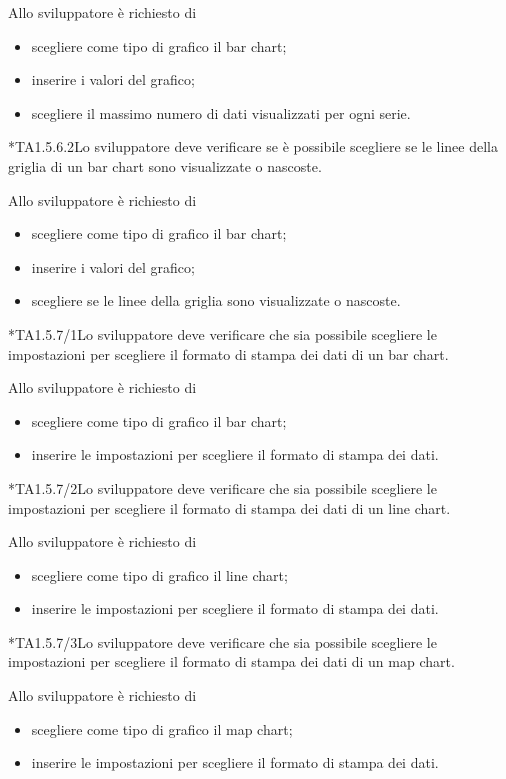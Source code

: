 		Allo sviluppatore è richiesto di
		\begin{itemize}
			\item scegliere come tipo di grafico il bar chart;
			\item inserire i valori del grafico;
			\item scegliere il massimo numero di dati visualizzati per ogni serie.
		\end{itemize}

	*{TA1.5.6.2}Lo sviluppatore deve verificare se è possibile scegliere se le linee della griglia di un bar chart sono visualizzate o nascoste.

		Allo sviluppatore è richiesto di
		\begin{itemize}
			\item scegliere come tipo di grafico il bar chart;
			\item inserire i valori del grafico;
			\item scegliere se le linee della griglia sono visualizzate o nascoste.
		\end{itemize}

	*{TA1.5.7/1}Lo sviluppatore deve verificare che sia possibile scegliere le impostazioni per scegliere il formato di stampa dei dati di un bar chart.

		Allo sviluppatore è richiesto di
		\begin{itemize}
			\item scegliere come tipo di grafico il bar chart;
			\item inserire le impostazioni per scegliere il formato di stampa dei dati.
		\end{itemize}

	*{TA1.5.7/2}Lo sviluppatore deve verificare che sia possibile scegliere le impostazioni per scegliere il formato di stampa dei dati di un line chart.

		Allo sviluppatore è richiesto di
		\begin{itemize}
			\item scegliere come tipo di grafico il line chart;
			\item inserire le impostazioni per scegliere il formato di stampa dei dati.
		\end{itemize}

	*{TA1.5.7/3}Lo sviluppatore deve verificare che sia possibile scegliere le impostazioni per scegliere il formato di stampa dei dati di un map chart.

		Allo sviluppatore è richiesto di
		\begin{itemize}
			\item scegliere come tipo di grafico il map chart;
			\item inserire le impostazioni per scegliere il formato di stampa dei dati.
		\end{itemize}

